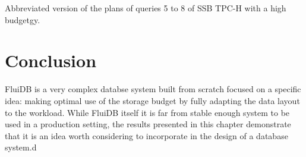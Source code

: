 \begin{code}
\begin{verbatim}
\end{verbatim}
  \caption{\label{fig:reverse_operations}Abbreviated version of the
    plans of queries 5 to 8 of SSB TPC-H with a high budgetgy.}

\end{code}

\section{Conclusion}

FluiDB is a very complex databse system built from scratch focused on
a specific idea: making optimal use of the storage budget by fully
adapting the data layout to the workload. While FluiDB itself it is
far from stable enough system to be used in a production setting, the
results presented in this chapter demonstrate that it is an idea worth
considering to incorporate in the design of a database system.d
